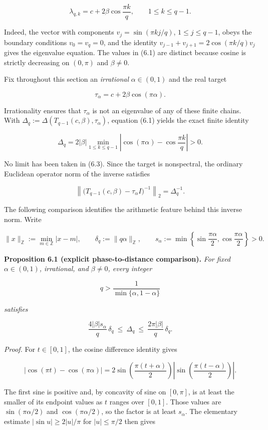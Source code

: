 \documentclass[
  11pt,
]{article}
\begin{document}
\[
\lambda_{q,k}=c+2\beta\cos\frac{\pi k}{q},
\qquad 1\le k\le q-1.
\tag{6.1}
\]

Indeed, the vector with components \(v_j=\sin(\pi kj/q)\),
\(1\le j\le q-1\), obeys the boundary conditions \(v_0=v_q=0\), and the
identity \(v_{j-1}+v_{j+1}=2\cos(\pi k/q)v_j\) gives the eigenvalue
equation. The values in (6.1) are distinct because cosine is strictly
decreasing on \((0,\pi)\) and \(\beta\ne0\).

Fix throughout this section an \emph{irrational} \(\alpha\in(0,1)\) and
the real target

\[
\tau_\alpha=c+2\beta\cos(\pi\alpha).
\tag{6.2}
\]

Irrationality ensures that \(\tau_\alpha\) is not an eigenvalue of any
of these finite chains. With
\(\Delta_q:=\Delta(T_{q-1}(c,\beta),\tau_\alpha)\), equation (6.1)
yields the exact finite identity

\[
\Delta_q=2|\beta|\min_{1\le k\le q-1}
  \left|\cos(\pi\alpha)-\cos\frac{\pi k}{q}\right|>0.
\tag{6.3}
\]

No limit has been taken in (6.3). Since the target is nonspectral, the
ordinary Euclidean operator norm of the inverse satisfies

\[
\left\|\bigl(T_{q-1}(c,\beta)-\tau_\alpha I\bigr)^{-1}\right\|_2
=\Delta_q^{-1}.
\tag{6.4}
\]

The following comparison identifies the arithmetic feature behind this
inverse norm. Write

\[
\|x\|_{\mathbb Z}:=\min_{m\in\mathbb Z}|x-m|,
\qquad \delta_q:=\|q\alpha\|_{\mathbb Z},
\qquad s_\alpha:=\min\left\{\sin\frac{\pi\alpha}{2},
\cos\frac{\pi\alpha}{2}\right\}>0.
\tag{6.5}
\]

\textbf{Proposition 6.1 (explicit phase-to-distance comparison).}
\emph{For fixed \(\alpha\in(0,1)\), irrational, and \(\beta\ne0\), every
integer}

\[
q>\frac{1}{\min\{\alpha,1-\alpha\}}
\tag{6.6}
\]

\emph{satisfies}

\[
\boxed{
\frac{4|\beta|s_\alpha}{q}\,\delta_q
\ \le\ \Delta_q\ \le\
\frac{2\pi|\beta|}{q}\,\delta_q.}
\tag{6.7}
\]

\emph{Proof.} For \(t\in[0,1]\), the cosine difference identity gives

\[
|\cos(\pi t)-\cos(\pi\alpha)|
=2\sin\!\left(\frac{\pi(t+\alpha)}2\right)
 \left|\sin\!\left(\frac{\pi(t-\alpha)}2\right)\right|.
\]

The first sine is positive and, by concavity of sine on \([0,\pi]\), is
at least the smaller of its endpoint values as \(t\) ranges over
\([0,1]\). Those values are \(\sin(\pi\alpha/2)\) and
\(\cos(\pi\alpha/2)\), so the factor is at least \(s_\alpha\). The
elementary estimate \(|\sin u|\ge2|u|/\pi\) for \(|u|\le\pi/2\) then
gives
\end{document}
